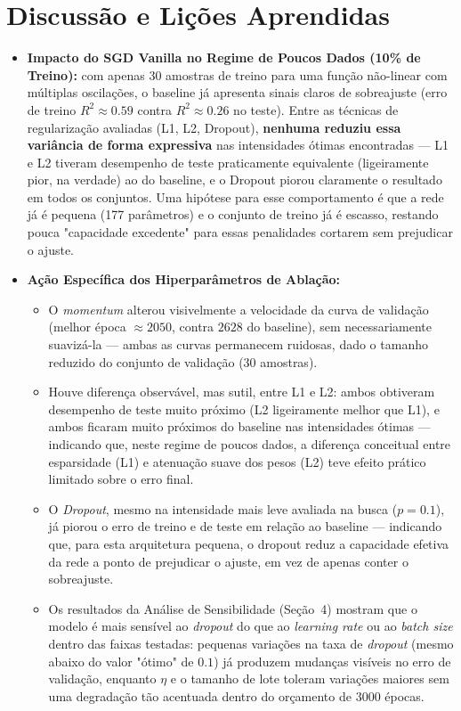\documentclass[11pt,a4paper]{article}
\begin{document}
\section{Discussão e Lições Aprendidas}

\begin{itemize}
    \item \textbf{Impacto do SGD Vanilla no Regime de Poucos Dados (10\% de Treino):} com apenas 30 amostras de treino para uma função não-linear com múltiplas oscilações, o baseline já apresenta sinais claros de sobreajuste (erro de treino $R^2 \approx 0.59$ contra $R^2 \approx 0.26$ no teste). Entre as técnicas de regularização avaliadas (L1, L2, Dropout), \textbf{nenhuma reduziu essa variância de forma expressiva} nas intensidades ótimas encontradas — L1 e L2 tiveram desempenho de teste praticamente equivalente (ligeiramente pior, na verdade) ao do baseline, e o Dropout piorou claramente o resultado em todos os conjuntos. Uma hipótese para esse comportamento é que a rede já é pequena (177 parâmetros) e o conjunto de treino já é escasso, restando pouca "capacidade excedente" para essas penalidades cortarem sem prejudicar o ajuste.
    \item \textbf{Ação Específica dos Hiperparâmetros de Ablação:}
    \begin{itemize}
        \item O \textit{momentum} alterou visivelmente a velocidade da curva de validação (melhor época $\approx 2050$, contra $2628$ do baseline), sem necessariamente suavizá-la — ambas as curvas permanecem ruidosas, dado o tamanho reduzido do conjunto de validação (30 amostras).
        \item Houve diferença observável, mas sutil, entre L1 e L2: ambos obtiveram desempenho de teste muito próximo (L2 ligeiramente melhor que L1), e ambos ficaram muito próximos do baseline nas intensidades ótimas — indicando que, neste regime de poucos dados, a diferença conceitual entre esparsidade (L1) e atenuação suave dos pesos (L2) teve efeito prático limitado sobre o erro final.
        \item O \textit{Dropout}, mesmo na intensidade mais leve avaliada na busca ($p=0.1$), já piorou o erro de treino e de teste em relação ao baseline — indicando que, para esta arquitetura pequena, o dropout reduz a capacidade efetiva da rede a ponto de prejudicar o ajuste, em vez de apenas conter o sobreajuste.
        \item Os resultados da Análise de Sensibilidade (Seção~4) mostram que o modelo é mais sensível ao \textit{dropout} do que ao \textit{learning rate} ou ao \textit{batch size} dentro das faixas testadas: pequenas variações na taxa de \textit{dropout} (mesmo abaixo do valor "ótimo" de $0.1$) já produzem mudanças visíveis no erro de validação, enquanto $\eta$ e o tamanho de lote toleram variações maiores sem uma degradação tão acentuada dentro do orçamento de 3000 épocas.

\end{itemize}
\end{itemize}
\end{document}
